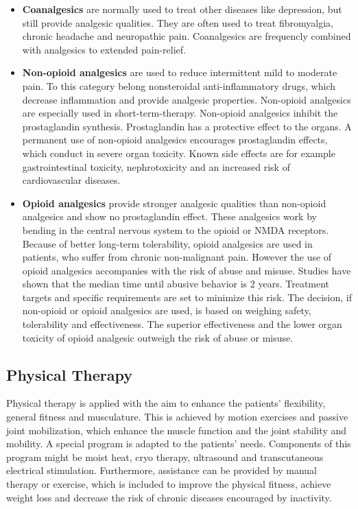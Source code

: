 \begin{itemize}
\item \textbf{Coanalgesics} are normally used to treat other diseases like depression, but still provide analgesic qualities. They are often used to treat fibromyalgia, chronic headache and neuropathic pain. Coanalgesics are frequencly combined with analgesics to extended pain-relief. \cite{marcus2009}

\item \textbf{Non-opioid analgesics} are used to reduce intermittent mild to moderate pain. To this category belong nonsteroidal anti-inflammatory drugs, which decrease inflammation and provide analgesic properties. Non-opioid analgesics are especially used in short-term-therapy. Non-opioid analgesics inhibit the prostaglandin synthesis. Prostaglandin has a protective effect to the organs. A permanent use of non-opioid analgesics encourages prostaglandin effects, which conduct in severe organ toxicity. Known side effects are for example gastrointestinal toxicity, nephrotoxicity and an increased risk of cardiovascular diseases. \cite{marcus2009,stein2007}

\item \textbf{Opioid analgesics} provide stronger analgesic qualities than non-opioid analgesics and show no prostaglandin effect. These analgesics work by bending in the central nervous system to the opioid or NMDA receptors.  Because of better long-term tolerability, opioid analgesics are used in patients, who suffer from chronic non-malignant pain. However the use of opioid analgesics accompanies with the risk of abuse and misuse. Studies have shown that the median time until abusive behavior is 2 years. Treatment targets and specific requirements are set to minimize this risk. \cite{marcus2009,stein2007}
The decision, if non-opioid or opioid analgesics are used, is based on weighing safety, tolerability and effectiveness. The superior effectiveness and the lower organ toxicity of opioid analgesic outweigh the risk of abuse or misuse. \cite{marcus2009} 
\end{itemize}

\subsection{Physical Therapy}
Physical therapy is applied with the aim to enhance the patients' flexibility, general fitness and musculature. This is achieved by motion exercises and passive joint mobilization, which enhance the muscle function and the joint stability and mobility. A special program is adapted to the patients' needs. Components of this program might be moist heat, cryo therapy, ultrasound and transcutaneous electrical stimulation. Furthermore, assistance can be provided by manual therapy or exercise, which is included to improve the physical fitness, achieve weight loss and decrease the risk of chronic diseases encouraged by inactivity. \cite{marcus2009,pope2017}

